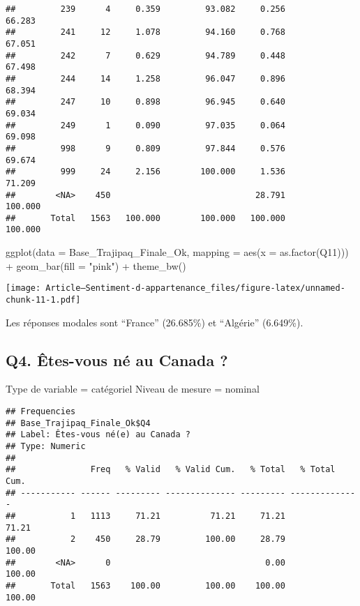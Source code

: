 \documentclass[
]{article}
\newenvironment{Shaded}{\begin{snugshade}}{\end{snugshade}}
\newcommand{\AttributeTok}[1]{\textcolor[rgb]{0.77,0.63,0.00}{#1}}
\newcommand{\FunctionTok}[1]{\textcolor[rgb]{0.00,0.00,0.00}{#1}}
\newcommand{\NormalTok}[1]{#1}
\newcommand{\SpecialCharTok}[1]{\textcolor[rgb]{0.00,0.00,0.00}{#1}}
\newcommand{\StringTok}[1]{\textcolor[rgb]{0.31,0.60,0.02}{#1}}
\begin{document}
\begin{verbatim}
##         239      4     0.359         93.082     0.256         66.283
##         241     12     1.078         94.160     0.768         67.051
##         242      7     0.629         94.789     0.448         67.498
##         244     14     1.258         96.047     0.896         68.394
##         247     10     0.898         96.945     0.640         69.034
##         249      1     0.090         97.035     0.064         69.098
##         998      9     0.809         97.844     0.576         69.674
##         999     24     2.156        100.000     1.536         71.209
##        <NA>    450                             28.791        100.000
##       Total   1563   100.000        100.000   100.000        100.000
\end{verbatim}

\begin{Shaded}
\begin{Highlighting}[]
\FunctionTok{ggplot}\NormalTok{(}\AttributeTok{data =}\NormalTok{ Base\_Trajipaq\_Finale\_Ok, }\AttributeTok{mapping =} \FunctionTok{aes}\NormalTok{(}\AttributeTok{x =} \FunctionTok{as.factor}\NormalTok{(Q11))) }\SpecialCharTok{+}
  \FunctionTok{geom\_bar}\NormalTok{(}\AttributeTok{fill =} \StringTok{"pink"}\NormalTok{) }\SpecialCharTok{+}
  \FunctionTok{theme\_bw}\NormalTok{()}
\end{Highlighting}
\end{Shaded}

\texttt{[image: Article---Sentiment-d-appartenance\_files/figure-latex/unnamed-chunk-11-1.pdf]}

Les réponses modales sont ``France'' (26.685\%) et ``Algérie''
(6.649\%).

\hypertarget{q4.-uxeates-vous-nuxe9-au-canada}{%
\subsection{Q4. Êtes-vous né au Canada
?}\label{q4.-uxeates-vous-nuxe9-au-canada}}

Type de variable = catégoriel Niveau de mesure = nominal

\begin{Shaded}
\end{Shaded}

\begin{verbatim}
## Frequencies  
## Base_Trajipaq_Finale_Ok$Q4  
## Label: Êtes-vous né(e) au Canada ?  
## Type: Numeric  
## 
##               Freq   % Valid   % Valid Cum.   % Total   % Total Cum.
## ----------- ------ --------- -------------- --------- --------------
##           1   1113     71.21          71.21     71.21          71.21
##           2    450     28.79         100.00     28.79         100.00
##        <NA>      0                               0.00         100.00
##       Total   1563    100.00         100.00    100.00         100.00
\end{verbatim}
\end{document}
